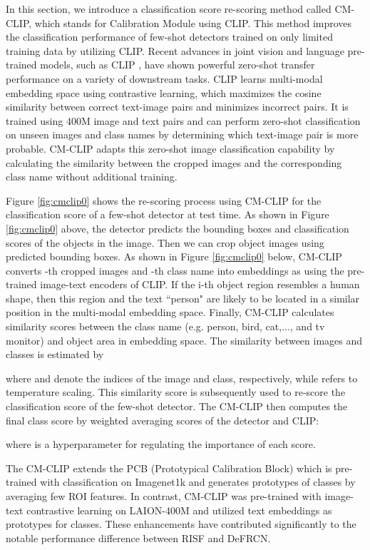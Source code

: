 \documentclass{article}
\begin{document}
In this section, we introduce a classification score re-scoring method called CM-CLIP, which stands for Calibration Module using CLIP. 
This method improves the classification performance of few-shot detectors trained on only limited training data by utilizing CLIP.
Recent advances in joint vision and language pre-trained models, such as CLIP \cite{clip}, have shown powerful zero-shot transfer performance on a variety of downstream tasks.
CLIP learns multi-modal embedding space using contrastive learning, which maximizes the cosine similarity between correct text-image pairs and minimizes incorrect pairs. It is trained using 400M  image and text pairs and can perform zero-shot classification on unseen images and class names by determining which text-image pair is more probable. 
CM-CLIP adapts this zero-shot image classification capability by calculating the similarity between the cropped images and the corresponding class name without additional training.

Figure \ref{fig:cmclip0} shows the re-scoring process using CM-CLIP for the classification score of a few-shot detector at test time.
As shown in Figure \ref{fig:cmclip0} above, the detector predicts the bounding boxes and classification scores of the objects in the image. 
Then we can crop object images using predicted bounding boxes. As shown in Figure \ref{fig:cmclip0} below, CM-CLIP converts -th cropped images and -th class name into embeddings as  using the pre-trained image-text encoders of CLIP.
If the i-th object region resembles a human shape, then this region and the text ``person" are likely to be located in a similar position in the multi-modal embedding space.
Finally, CM-CLIP calculates similarity scores between the class name (e.g. person, bird, cat,..., and tv monitor) and object area in embedding space.
The similarity between images and classes is estimated by  

where  and  denote the indices of the image and class, respectively, while  refers to temperature scaling. 
This similarity score is subsequently used to re-score the classification score of the few-shot detector.  
The CM-CLIP then computes the final class score by weighted averaging scores of the detector and CLIP:

where  is a  hyperparameter for regulating the importance of each score.

The CM-CLIP extends the PCB (Prototypical Calibration Block) \cite{defrcn} which is pre-trained with classification on Imagenet1k \cite{IMAGENET} and generates prototypes of classes by averaging few ROI features. In contrast, CM-CLIP was pre-trained with image-text contrastive learning on LAION-400M \cite{LAION} and utilized text embeddings as prototypes for classes. 
These enhancements have contributed significantly to the notable performance difference between RISF and DeFRCN.
\end{document}
